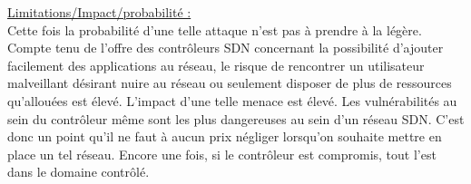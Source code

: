 \underline{Limitations/Impact/probabilité :}\\
Cette fois la probabilité d’une telle attaque n’est pas à prendre à la légère. Compte tenu de l’offre des contrôleurs SDN concernant la possibilité d’ajouter facilement des applications au réseau, le risque de rencontrer un utilisateur malveillant désirant nuire au réseau ou seulement disposer de plus de ressources qu’allouées est élevé. L’impact d’une telle menace est élevé. Les vulnérabilités au sein du contrôleur même sont les plus dangereuses au sein d’un réseau SDN. C’est donc un point qu’il ne faut à aucun prix négliger lorsqu'on souhaite mettre en place un tel réseau. Encore une fois, si le contrôleur est compromis, tout l'est dans le domaine contrôlé.
